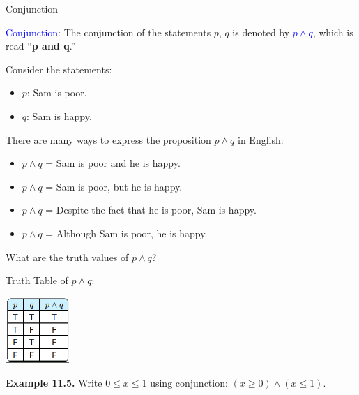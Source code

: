 \documentclass[aspectratio=169]{beamer}
\providecommand{\Blue}[1]{\textcolor{blue}{#1}}
\begin{document}
\begin{frame}[plain]{Conjunction }

\Blue{Conjunction}: The conjunction of the statements $p$, $q$ is denoted 
        by \Blue{$p\wedge q$}, which is read ``{\bf p and q}.'' 
 \medskip
 
 Consider the statements:
 \begin{itemize}
    \item $p$: Sam is poor.
    \item $q$: Sam is happy. 
 \end{itemize}
 
 There are many ways to express the proposition $p\wedge q$ in English:\pause 
 \begin{itemize}
  \item $p\wedge q$ = Sam is poor and he is happy. \pause
  \item $p\wedge q$ = Sam is poor, but he is happy.
  \item $p\wedge q$ = Despite the fact that he is poor, Sam is happy.
  \item $p\wedge q$ = Although Sam is poor, he is happy.
 \end{itemize}
 
 \medskip
 
 What are the truth values of $p\wedge q$?
 \end{frame}
 

\begin{frame}[plain]{}

 Truth Table of $p\wedge q$:
 
              \begin{center}
                \includegraphics[height=2.5cm]{./img/lecture11-fig3.png}
              \end{center}               

{\bf Example 11.5.} Write $0\leq x\leq 1$ using conjunction: \pause 
        $(x\geq 0) \wedge (x\leq 1)$.
        
     \vspace{.7in}
     

\end{frame}
\end{document}
